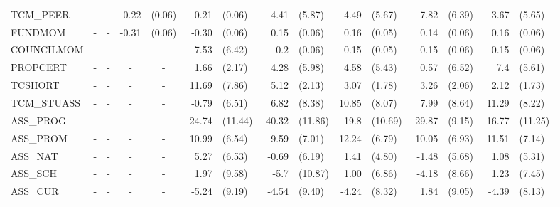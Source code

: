 \documentclass[12pt]{article}%
\begin{document}
\begin{table}[H]
\begin{tabular}{lrlrlrlrlrlrlrl}
			TCM\_PEER & \multicolumn{1}{c}{-} & \multicolumn{1}{c}{-} & 0.22  & (0.06) & 0.21  & (0.06) & -4.41 & (5.87) & -4.49 & (5.67) & -7.82 & (6.39) & -3.67 & (5.65) \\[0.2em]
			FUNDMOM & \multicolumn{1}{c}{-} & \multicolumn{1}{c}{-} & -0.31 & (0.06) & -0.30 & (0.06) & 0.15  & (0.06) & 0.16  & (0.05) & 0.14  & (0.06) & 0.16  & (0.06) \\[0.2em]
			COUNCILMOM & \multicolumn{1}{c}{-} & \multicolumn{1}{c}{-} & \multicolumn{1}{c}{-} & \multicolumn{1}{c}{-} & 7.53  & (6.42) & -0.2  & (0.06) & -0.15 & (0.05) & -0.15 & (0.06) & -0.15 & (0.06) \\[0.2em]
			PROPCERT & \multicolumn{1}{c}{-} & \multicolumn{1}{c}{-} & \multicolumn{1}{c}{-} & \multicolumn{1}{c}{-} & 1.66  & (2.17) & 4.28  & (5.98) & 4.58  & (5.43) & 0.57  & (6.52) & 7.4   & (5.61) \\[0.2em]
			TCSHORT & \multicolumn{1}{c}{-} & \multicolumn{1}{c}{-} & \multicolumn{1}{c}{-} & \multicolumn{1}{c}{-} & 11.69 & (7.86) & 5.12  & (2.13) & 3.07  & (1.78) & 3.26  & (2.06) & 2.12  & (1.73) \\[0.2em]
			TCM\_STUASS & \multicolumn{1}{c}{-} & \multicolumn{1}{c}{-} & \multicolumn{1}{c}{-} & \multicolumn{1}{c}{-} & -0.79 & (6.51) & 6.82  & (8.38) & 10.85 & (8.07) & 7.99  & (8.64) & 11.29 & (8.22) \\[0.2em]
			ASS\_PROG & \multicolumn{1}{c}{-} & \multicolumn{1}{c}{-} & \multicolumn{1}{c}{-} & \multicolumn{1}{c}{-} & -24.74 & (11.44) & -40.32 & (11.86) & -19.8 & (10.69) & -29.87 & (9.15) & -16.77 & (11.25) \\[0.2em]
			ASS\_PROM & \multicolumn{1}{c}{-} & \multicolumn{1}{c}{-} & \multicolumn{1}{c}{-} & \multicolumn{1}{c}{-} & 10.99 & (6.54) & 9.59  & (7.01) & 12.24 & (6.79) & 10.05 & (6.93) & 11.51 & (7.14) \\[0.2em]
			ASS\_NAT & \multicolumn{1}{c}{-} & \multicolumn{1}{c}{-} & \multicolumn{1}{c}{-} & \multicolumn{1}{c}{-} & 5.27  & (6.53) & -0.69 & (6.19) & 1.41  & (4.80) & -1.48 & (5.68) & 1.08  & (5.31) \\[0.2em]
			ASS\_SCH & \multicolumn{1}{c}{-} & \multicolumn{1}{c}{-} & \multicolumn{1}{c}{-} & \multicolumn{1}{c}{-} & 1.97  & (9.58) & -5.7  & (10.87) & 1.00  & (6.86) & -4.18 & (8.66) & 1.23  & (7.45) \\[0.2em]
			ASS\_CUR & \multicolumn{1}{c}{-} & \multicolumn{1}{c}{-} & \multicolumn{1}{c}{-} & \multicolumn{1}{c}{-} & -5.24 & (9.19) & -4.54 & (9.40) & -4.24 & (8.32) & 1.84  & (9.05) & -4.39 & (8.13) \\[0.2em]

\end{tabular}
\end{table}
\end{document}

